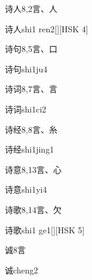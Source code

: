 \begin{Entry}{诗人}{8,2}{⾔、⼈}
  \begin{Phonetics}{诗人}{shi1 ren2}[][HSK 4]
  \end{Phonetics}
\end{Entry}

\begin{Entry}{诗句}{8,5}{⾔、⼝}
  \begin{Phonetics}{诗句}{shi1ju4}
  \end{Phonetics}
\end{Entry}

\begin{Entry}{诗词}{8,7}{⾔、⾔}
  \begin{Phonetics}{诗词}{shi1ci2}
  \end{Phonetics}
\end{Entry}

\begin{Entry}{诗经}{8,8}{⾔、⽷}
  \begin{Phonetics}{诗经}{shi1jing1}
  \end{Phonetics}
\end{Entry}

\begin{Entry}{诗意}{8,13}{⾔、⼼}
  \begin{Phonetics}{诗意}{shi1yi4}
  \end{Phonetics}
\end{Entry}

\begin{Entry}{诗歌}{8,14}{⾔、⽋}
  \begin{Phonetics}{诗歌}{shi1 ge1}[][HSK 5]
  \end{Phonetics}
\end{Entry}

\begin{Entry}{诚}{8}{⾔}
  \begin{Phonetics}{诚}{cheng2}
  \end{Phonetics}
\end{Entry}

